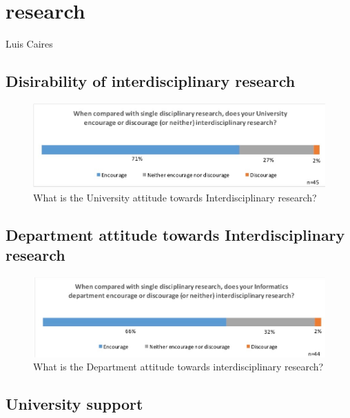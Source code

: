 \section{research}

Luis Caires

\subsection{Disirability of interdisciplinary research}

\begin{figure}[h]
\centering
\includegraphics[width = \linewidth]{charts/1a.jpg}
\caption{What is the University attitude towards Interdisciplinary research?}
\label{sect1:Uattitude}
\end{figure}

\subsection{Department attitude towards Interdisciplinary research}


\begin{figure}[h]
\centering
\includegraphics[width = \linewidth]{charts/1b.jpg}
\caption{What is the Department attitude towards interdisciplinary research?}
\label{sect1:Dattitude}
\end{figure}

\subsection{University support}

